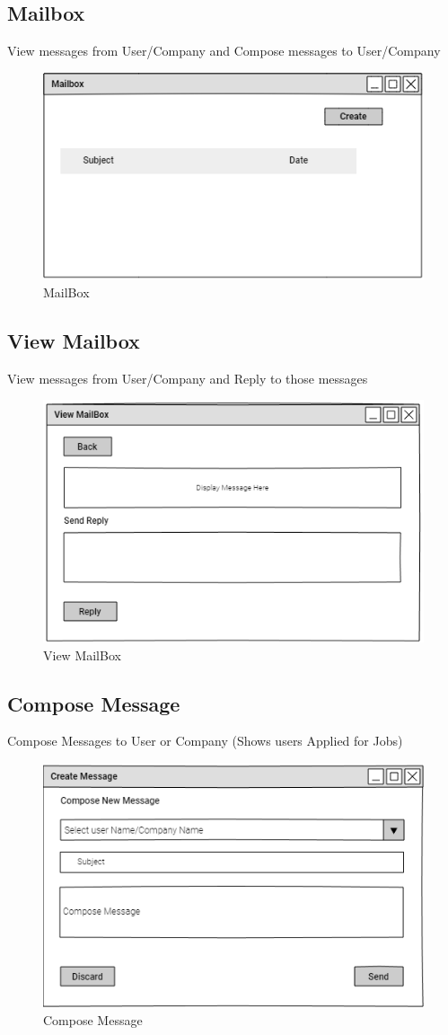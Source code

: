 \documentclass[a4paper,12pt]{report}
\begin{document}
\subsection {Mailbox}
View messages from User/Company and Compose messages to User/Company
\begin{figure}[bph]
	\centering
	\includegraphics[width=.7\linewidth]{img/notification}
	\caption{MailBox}
\end{figure}


\subsection {View Mailbox}
View messages from User/Company and Reply to those messages
\begin{figure}[bph]
	\centering
	\includegraphics[width=.7\linewidth]{img/view_notifctn}
	\caption{View MailBox}
\end{figure}
\pagebreak

\subsection {Compose Message}
Compose Messages to User or Company (Shows users Applied for Jobs)
\begin{figure}[bph]
	\centering
	\includegraphics[width=.5\linewidth]{img/create_msg}
	\caption{Compose Message}
\end{figure}
\end{document}
